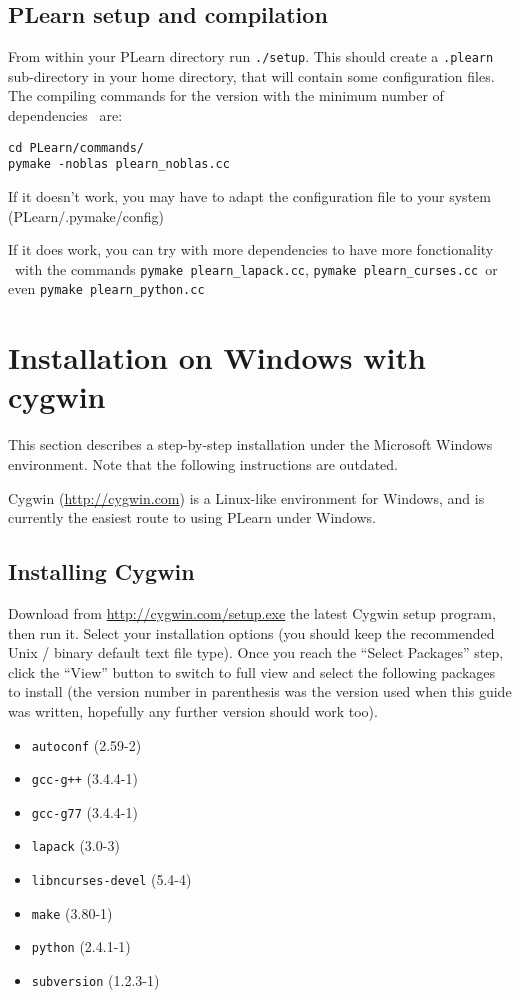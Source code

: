 \documentclass[11pt]{book}
\begin{document}
\subsection{PLearn setup and compilation}

From within your PLearn directory run {\tt ./setup}. This should create a
{\tt .plearn} sub-directory in your home directory, that will contain some
configuration files.
The compiling commands for the version with the minimum number of dependencies \
are:
\begin{verbatim}
cd PLearn/commands/
pymake -noblas plearn_noblas.cc
\end{verbatim}

If it doesn't work, you may have to adapt the configuration file to your system
(PLearn/.pymake/config)

If it does work, you can try with more dependencies to have more fonctionality \
with the commands \verb!pymake plearn_lapack.cc!, \verb!pymake plearn_curses.cc!\
 or even \verb!pymake plearn_python.cc!


\section{Installation on Windows with cygwin}
\label{sec:windows}

This section describes a step-by-step installation under the Microsoft Windows environment.
Note that the following instructions are outdated.

Cygwin (\url{http://cygwin.com}) is a Linux-like environment for Windows, and is
currently the easiest route to using PLearn under Windows.

\subsection{Installing Cygwin}
Download from \url{http://cygwin.com/setup.exe} the latest Cygwin setup program,
then run it.
Select your installation options (you should keep the recommended Unix / binary default
text file type).
Once you reach the ``Select Packages'' step, click the ``View'' button to switch
to full view and select the following packages to install (the version number in
parenthesis was the version used when this guide was written, hopefully any further
version should work too).

\begin{itemize}
\item \verb!autoconf! (2.59-2)
\item \verb!gcc-g++! (3.4.4-1)
\item \verb!gcc-g77! (3.4.4-1)
\item \verb!lapack! (3.0-3)
\item \verb!libncurses-devel! (5.4-4)
\item \verb!make! (3.80-1)
\item \verb!python! (2.4.1-1)
\item \verb!subversion! (1.2.3-1)
\end{itemize}
\end{document}
